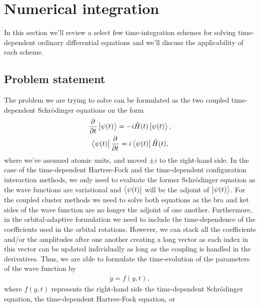    \section{Numerical integration}
        \label{sec:numerical-integration}
        In this section we'll review a select few time-integration schemes for
        solving time-dependent ordinary differential equations and we'll discuss the
        applicability of each scheme.

        \subsection{Problem statement}
            The problem we are trying to solve can be formulated as the
            two coupled time-dependent Schrödinger equations on the form
            \begin{gather}
                \dpd{}{t}\ket{\psi(t)}
                = -i\hamil(t)\ket{\psi(t)},
                \\
                \bra{\psi(t)}\dpd{}{t}
                = i\bra{\psi(t)}\hamil(t),
            \end{gather}
            where we've assumed atomic units, and moved $\pm i$ to the right-hand
            side.
            In the case of the time-dependent Hartree-Fock and the
            time-dependent configuration interaction methods, we only need to
            evaluate the former Schrödinger equation as the wave functions are
            variational and $\bra{\psi(t)}$ will be the adjoint of
            $\ket{\psi(t)}$.
            For the coupled cluster methods we need to solve both equations as
            the bra and ket sides of the wave function are no longer the adjoint
            of one another.
            Furthermore, in the orbital-adaptive formulation we need to include
            the time-dependence of the coefficients used in the orbital
            rotations.
            However, we can stack all the coefficients and/or the amplitudes
            after one another creating a long vector as each index in this
            vector can be updated individually as long as the coupling is
            handled in the derivatives.
            Thus, we are able to formulate the time-evolution of the
            parameters of the wave function by
            \begin{align}
                \dot{y} = f(y, t),
            \end{align}
            where $f(y, t)$ represents the right-hand side the time-dependent
            Schrödinger equation, the time-dependent Hartree-Fock equation, or
